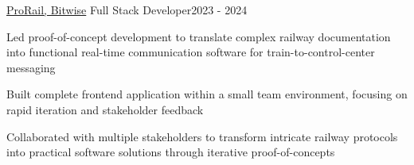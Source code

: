 \resumeSubheading
  {\href{}{ProRail, Bitwise}}{}
  {Full Stack Developer}{2023 - 2024}
  \vspace{\experienceItemSpacing}
  \resumeItemListStart
\item Led proof-of-concept development to translate complex railway documentation into functional real-time communication software for train-to-control-center messaging
\item Built complete frontend application within a small team environment, focusing on rapid iteration and stakeholder feedback
\item Collaborated with multiple stakeholders to transform intricate railway protocols into practical software solutions through iterative proof-of-concepts
  \resumeItemListEnd 